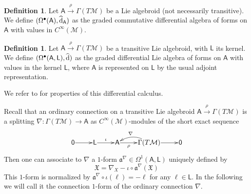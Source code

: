 \documentclass[number]{elsarticle}
\theoremstyle{definition}
\newtheorem{definition}[theorem]{Definition}
\theoremstyle{remark}
\numberwithin{equation}{section}
\begin{document}
\begin{definition}
\label{def-formsvaluesfunctions}
Let ${{{{\mathbf{\mathsf{{A}}}}}}} \xrightarrow{\rho} \Gamma(T{{{{\mathcal{{M}}}}}})$ be a Lie algebroid (not necessarily transitive).
We define $(\Omega^{\bullet}({{{{\mathbf{\mathsf{{A}}}}}}}), {\widehat{\text{\textup{d}}}}_{{{{\mathbf{\mathsf{{A}}}}}}})$ as the graded commutative differential algebra of forms on ${{{{\mathbf{\mathsf{{A}}}}}}}$ with values in $C^\infty({{{{\mathcal{{M}}}}}})$. 
\end{definition}

\begin{definition}
\label{def-formsvalueskernel}
Let ${{{{\mathbf{\mathsf{{A}}}}}}} \xrightarrow{\rho} \Gamma(T{{{{\mathcal{{M}}}}}})$ be a transitive Lie algebroid, with ${{{{\mathbf{\mathsf{{L}}}}}}}$ its kernel.
We define $(\Omega^{\bullet}({{{{\mathbf{\mathsf{{A}}}}}}}, {{{{\mathbf{\mathsf{{L}}}}}}}), {\widehat{\text{\textup{d}}}})$ as the graded differential Lie algebra of forms on ${{{{\mathbf{\mathsf{{A}}}}}}}$ with values in the kernel ${{{{\mathbf{\mathsf{{L}}}}}}}$, where ${{{{\mathbf{\mathsf{{A}}}}}}}$ is represented on ${{{{\mathbf{\mathsf{{L}}}}}}}$ by the usual adjoint representation.
\end{definition}

We refer to \cite{Mass38} for properties of this differential calculus.

Recall that an ordinary connection on a transitive Lie algebroid ${{{{\mathbf{\mathsf{{A}}}}}}} \xrightarrow{\rho} \Gamma(T {{{{\mathcal{{M}}}}}})$ is a splitting $\nabla : \Gamma(T {{{{\mathcal{{M}}}}}}) \rightarrow {{{{\mathbf{\mathsf{{A}}}}}}}$ as $C^\infty({{{{\mathcal{{M}}}}}})$-modules of the short exact sequence
\begin{equation}
\label{eq-ordinaryconnectionontransitivealgebroid}
\xymatrix@1@C=25pt{{{{{\mathsf{{0}}}}}} \ar[r] & {{{{\mathbf{\mathsf{{L}}}}}}} \ar[r]^-{\iota} & {{{{\mathbf{\mathsf{{A}}}}}}} \ar[r]_-{\rho} & {\Gamma(T {{{{\mathcal{{M}}}}}})} \ar[r] \ar@/_0.7pc/[l]_-{\nabla} & {{{{\mathsf{{0}}}}}}}
\end{equation}
Then one can associate to $\nabla$ a $1$-form ${\mathfrak{a}}^\nabla \in \Omega^1({{{{\mathbf{\mathsf{{A}}}}}}}, {{{{\mathbf{\mathsf{{L}}}}}}})$ uniquely defined by
\begin{equation*}
{{\mathfrak X}} = \nabla_X - \iota \circ {\mathfrak{a}}^\nabla({{\mathfrak X}})
\end{equation*}
This $1$-form is normalized by ${\mathfrak{a}}^\nabla \circ \iota(\ell) = -\ell$ for any $\ell \in {{{{\mathbf{\mathsf{{L}}}}}}}$. In the following we will call it the connection $1$-form of the ordinary connection $\nabla$.
\end{document}

